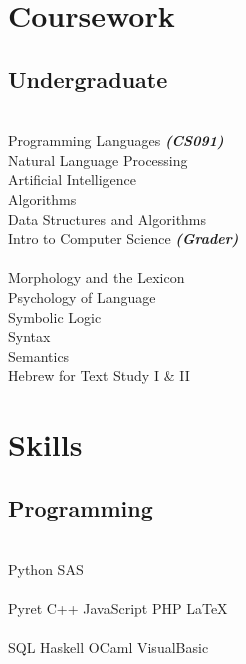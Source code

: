 \documentclass[]{deedy-resume-openfont}
\begin{document}
\begin{minipage}[t]{0.33\textwidth}

\section{Coursework}
\subsection{Undergraduate}
 \\
Programming Languages 
{\footnotesize \textit{\textbf{(CS091) }}}\\
Natural Language Processing \\
Artificial Intelligence \\
Algorithms \\
Data Structures and Algorithms \\
Intro to Computer Science
{\footnotesize \textit{\textbf{(Grader) }}} \\
 \\
Morphology and the Lexicon \\
Psychology of Language \\
Symbolic Logic \\
Syntax \\ 
Semantics \\
Hebrew for Text Study I \& II \\

\sectionsep


\section{Skills}
\subsection{Programming}
 \\
Python \textbullet{}   SAS  \\
 \\
Pyret \textbullet{} C++ \textbullet{} JavaScript \textbullet{} PHP \textbullet{} \LaTeX\ \\
	\\
SQL \textbullet{} Haskell \textbullet{} OCaml \textbullet{} VisualBasic \\
\sectionsep


\end{minipage}
\end{document}
